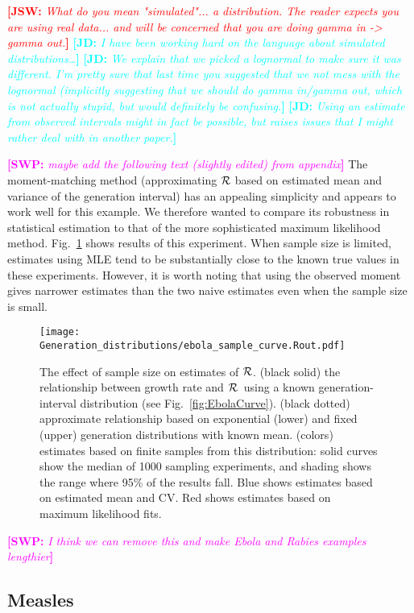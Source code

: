 \documentclass[12pt]{article}
\newcommand{\RR}{\ensuremath{{\cal R}}}
\newcommand{\fref}[1]{Fig.~\ref{fig:#1}}
\newcommand{\comment}[3]{\textcolor{#1}{\textbf{[#2: }\textit{#3}\textbf{]}}}
\newcommand{\jd}[1]{\comment{cyan}{JD}{#1}}
\newcommand{\swp}[1]{\comment{magenta}{SWP}{#1}}
\newcommand{\jsw}[1]{\comment{red}{JSW}{#1}}
\begin{document}
\jsw{What do you mean "simulated"... a distribution. The reader expects you are using real data... and will be concerned that you are doing gamma in -> gamma out.}
\jd{I have been working hard on the language about simulated distributions\ldots}
\jd{We explain that we picked a lognormal to make sure it was different. I'm pretty sure that last time you suggested that we not mess with the lognormal (implicitly suggesting that we \emph{should} do gamma in/gamma out, which is not actually stupid, but would definitely be confusing.}
\jd{Using an estimate from observed intervals might in fact be possible, but raises issues that I might rather deal with in another paper.}


\swp{maybe add the following text (slightly edited) from appendix}
The moment-matching method (approximating $\RR$ based on estimated mean and variance of the generation interval) has an appealing simplicity and appears to work well for this example. We therefore wanted to compare its robustness in statistical estimation to that of the more sophisticated maximum likelihood method. \fref{ebolaSample} shows results of this experiment. When sample size is limited, estimates using MLE tend to be substantially close to the known true values in these experiments. However, it is worth noting that using the observed moment gives narrower estimates than the two naive estimates even when the sample size is small.

\begin{figure}[htbp] \centering
	\texttt{[image: Generation\_distributions/ebola\_sample\_curve.Rout.pdf]}
\caption{
%
The effect of sample size on estimates of \RR.
(black solid) the relationship between growth rate and \RR~using a known generation-interval distribution (see \fref{EbolaCurve}).
(black dotted) approximate relationship based on exponential (lower) and fixed (upper) generation distributions with known mean.
(colors) estimates based on finite samples from this distribution: solid curves show the median of 1000 sampling experiments, and shading shows the range where 95\% of the results fall.
Blue shows estimates based on estimated mean and CV.
Red shows estimates based on maximum likelihood fits.
%
}
	\label{fig:ebolaSample}
\end{figure}

\swp{I think we can remove this and make Ebola and Rabies examples lengthier}
\subsection{Measles}
\end{document}
